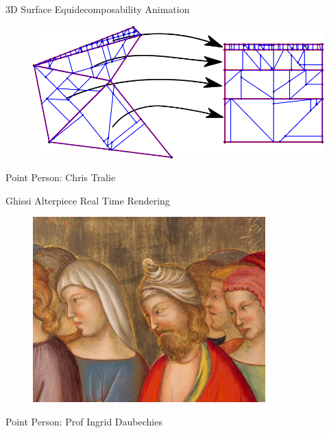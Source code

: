 \documentclass{beamer}
\begin{document}
\begin{frame}{3D Surface Equidecomposability Animation}

\begin{figure}[t]
	\centering
    \includegraphics[width=\textwidth]{FinalProjects/Equidecomposability.png}
\end{figure}

Point Person: Chris Tralie

\end{frame}

\begin{frame}{Ghissi Alterpiece Real Time Rendering}
\begin{figure}[t]
	\centering
    \includegraphics[width=0.8\textwidth]{FinalProjects/Ghissi_Alterpiece.png}
\end{figure}

Point Person: Prof Ingrid Daubechies

\end{frame}
\end{document}
